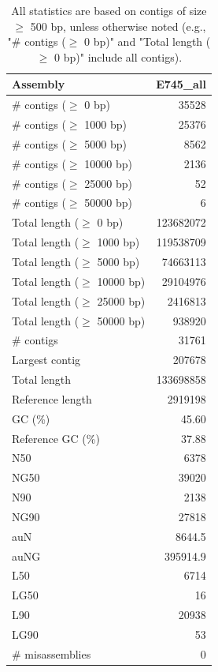 \documentclass[12pt,a4paper]{article}
\begin{document}
\begin{table}[ht]
\begin{center}
\caption{All statistics are based on contigs of size $\geq$ 500 bp, unless otherwise noted (e.g., "\# contigs ($\geq$ 0 bp)" and "Total length ($\geq$ 0 bp)" include all contigs).}
\begin{tabular}{|l*{1}{|r}|}
\hline
Assembly & E745\_all \\ \hline
\# contigs ($\geq$ 0 bp) & 35528 \\ \hline
\# contigs ($\geq$ 1000 bp) & 25376 \\ \hline
\# contigs ($\geq$ 5000 bp) & 8562 \\ \hline
\# contigs ($\geq$ 10000 bp) & 2136 \\ \hline
\# contigs ($\geq$ 25000 bp) & 52 \\ \hline
\# contigs ($\geq$ 50000 bp) & 6 \\ \hline
Total length ($\geq$ 0 bp) & 123682072 \\ \hline
Total length ($\geq$ 1000 bp) & 119538709 \\ \hline
Total length ($\geq$ 5000 bp) & 74663113 \\ \hline
Total length ($\geq$ 10000 bp) & 29104976 \\ \hline
Total length ($\geq$ 25000 bp) & 2416813 \\ \hline
Total length ($\geq$ 50000 bp) & 938920 \\ \hline
\# contigs & 31761 \\ \hline
Largest contig & 207678 \\ \hline
Total length & 133698858 \\ \hline
Reference length & 2919198 \\ \hline
GC (\%) & 45.60 \\ \hline
Reference GC (\%) & 37.88 \\ \hline
N50 & 6378 \\ \hline
NG50 & 39020 \\ \hline
N90 & 2138 \\ \hline
NG90 & 27818 \\ \hline
auN & 8644.5 \\ \hline
auNG & 395914.9 \\ \hline
L50 & 6714 \\ \hline
LG50 & 16 \\ \hline
L90 & 20938 \\ \hline
LG90 & 53 \\ \hline
\# misassemblies & 0 \\ \hline

\end{tabular}
\end{center}
\end{table}
\end{document}
